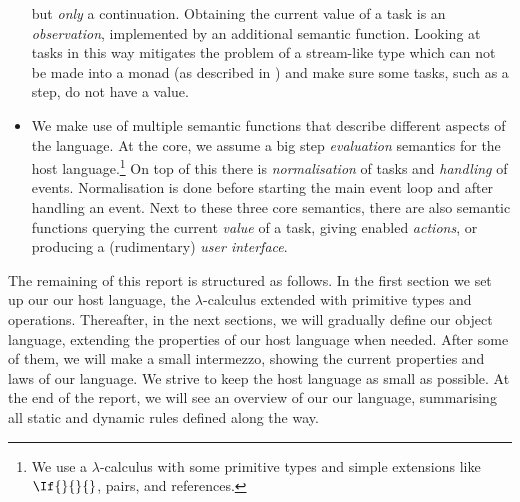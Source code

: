\begin{itemize}
    but \emph{only} a continuation.
    Obtaining the current value of a task is an \emph{observation},
    implemented by an additional semantic function.
    Looking at tasks in this way mitigates the problem of a stream-like type which can not be made into a monad
    (as described in \textcite{theses/radboud/VinterHviid18})
    and make sure some tasks, such as a step, do not have a value.
  \item
    We make use of multiple semantic functions that describe different aspects of the language.
    At the core, we assume a big step \emph{evaluation} semantics for the host language.\footnote{
      We use a $\lambda$-calculus with some primitive types and simple extensions like $\If{}{}{}$, pairs, and references.}
    On top of this there is \emph{normalisation} of tasks
    and \emph{handling} of events.
    Normalisation is done before starting the main event loop
    and after handling an event.
    Next to these three core semantics,
    there are also semantic functions querying the current \emph{value} of a task,
    giving enabled \emph{actions},
    or producing a (rudimentary) \emph{user interface}.
\end{itemize}

The remaining of this report is structured as follows.
In the first section we set up our our host language,
the $\lambda$-calculus extended with primitive types and operations.
Thereafter, in the next  sections, we will gradually define our object language,
extending the properties of our host language when needed.
After some of them,
we will make a small intermezzo,
showing the current properties and laws of our language.
We strive to keep the host language as small as possible.
At the end of the report,
we will see an overview of our our language,
summarising all static and dynamic rules defined along the way.
